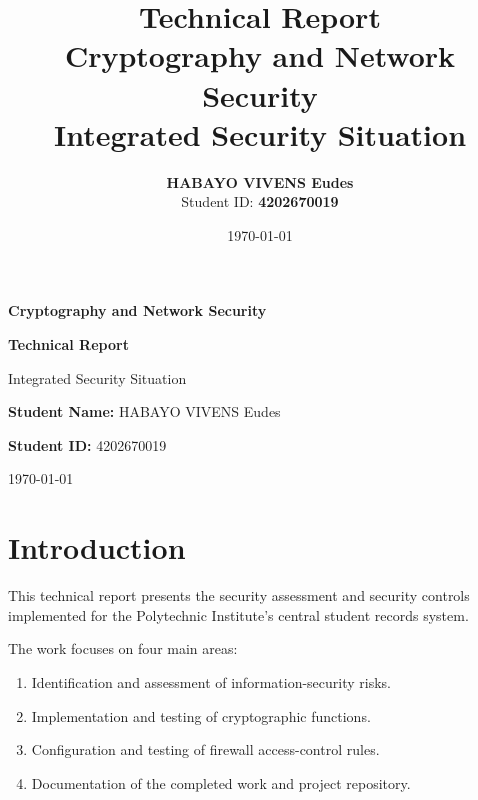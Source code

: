 \documentclass[12pt,a4paper]{article}
\title{
    \textbf{Technical Report}\\[0.3cm]
    \large Cryptography and Network Security\\
    \large Integrated Security Situation
}
\author{
    \textbf{HABAYO VIVENS Eudes}\\
    Student ID: \textbf{4202670019}
}
\date{\today}
\begin{document}
\begin{titlepage}

\centering

\vspace*{3cm}

{\Large \textbf{Cryptography and Network Security}\par}

\vspace{1.5cm}

{\Huge \textbf{Technical Report}\par}

\vspace{0.7cm}

{\Large Integrated Security Situation\par}

\vspace{2.5cm}

{\large
\textbf{Student Name:} HABAYO VIVENS Eudes
\par}

\vspace{0.4cm}

{\large
\textbf{Student ID:} 4202670019
\par}

\vspace{0.4cm}

\vfill

{\large \today\par}

\end{titlepage}


\section{Introduction}

This technical report presents the security assessment and security controls implemented for the Polytechnic Institute's central student records system.

The work focuses on four main areas:

\begin{enumerate}
    \item Identification and assessment of information-security risks.
    \item Implementation and testing of cryptographic functions.
    \item Configuration and testing of firewall access-control rules.
    \item Documentation of the completed work and project repository.
\end{enumerate}
\end{document}
